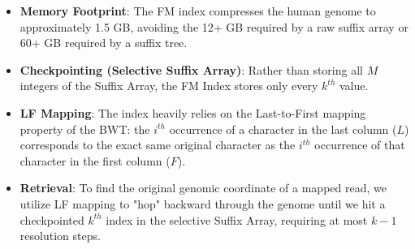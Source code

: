 \documentclass[11pt,a4paper]{article}
\begin{document}
\begin{itemize}
    \item \textbf{Memory Footprint}: The FM index compresses the human genome to approximately 1.5 GB, avoiding the 12+ GB required by a raw suffix array or 60+ GB required by a suffix tree.
    \item \textbf{Checkpointing (Selective Suffix Array)}: Rather than storing all $M$ integers of the Suffix Array, the FM Index stores only every $k^{th}$ value. 
    \item \textbf{LF Mapping}: The index heavily relies on the Last-to-First mapping property of the BWT: the $i^{th}$ occurrence of a character in the last column ($L$) corresponds to the exact same original character as the $i^{th}$ occurrence of that character in the first column ($F$).
    \item \textbf{Retrieval}: To find the original genomic coordinate of a mapped read, we utilize LF mapping to "hop" backward through the genome until we hit a checkpointed $k^{th}$ index in the selective Suffix Array, requiring at most $k-1$ resolution steps.
\end{itemize}
\end{document}
